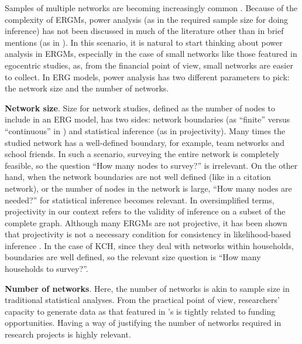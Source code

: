 \documentclass[12pt]{article}
\begin{document}
Samples of multiple networks are becoming increasingly common \citep{yonExponentialRandomGraph2021,krivitskyTaleTwoDatasets2022, duxburyScalingBiasPooled2023}. Because of the complexity of ERGMs, power analysis (as in the required sample size for doing inference) has not been discussed in much of the literature other than in brief mentions (as in \cite{yonExponentialRandomGraph2021}). In this scenario, it is natural to start thinking about power analysis in ERGMs, especially in the case of small networks like those featured in egocentric studies, as, from the financial point of view, small networks are easier to collect. In ERG models, power analysis has two different parameters to pick: the network size and the number of networks. 

\bigskip

\noindent \textbf{Network size}. Size for network studies, defined as the number of nodes to include in an ERG model, has two sides: network boundaries (as ``finite'' versus ``continuous'' in \cite{buttsRevisitingFoundationsNetwork2009}) and statistical inference (as in projectivity). Many times the studied network has a well-defined boundary, for example, team networks and school friends. In such a scenario, surveying the entire network is completely feasible, so the question ``How many nodes to survey?'' is irrelevant. On the other hand, when the network boundaries are not well defined (like in a citation network), or the number of nodes in the network is large, ``How many nodes are needed?'' for statistical inference becomes relevant. In oversimplified terms, projectivity in our context refers to the validity of inference on a subset of the complete graph. Although many ERGMs are not projective, it has been shown that projectivity is not a necessary condition for consistency in likelihood-based inference \citep{schweinbergerNoteRoleProjectivity2017, schweinbergerExponentialFamilyModelsRandom2020}. In the case of KCH, since they deal with networks within households, boundaries are well defined, so the relevant size question is ``How many households to survey?''.
 
\bigskip

\noindent\textbf{Number of networks}. Here, the number of networks is akin to sample size in traditional statistical analyses. From the practical point of view, researchers' capacity to generate data as that featured in \citeauthor*{krivitskyTaleTwoDatasets2022}'s is tightly related to funding opportunities. Having a way of justifying the number of networks required in research projects is highly relevant.
\end{document}
